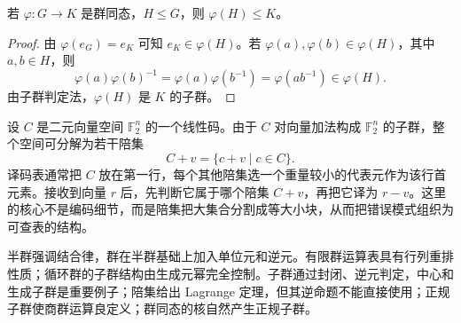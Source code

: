 \begin{theorem}[同态像保持子群]\label{homomorphic-image-subgroup}
  若 $\varphi:G\to K$ 是群同态，$H\le G$，则 $\varphi(H)\le K$。
\end{theorem}

\begin{proof}
  由 $\varphi(e_G)=e_K$ 可知 $e_K\in\varphi(H)$。若
  $\varphi(a),\varphi(b)\in\varphi(H)$，其中 $a,b\in H$，则
  \[
  \varphi(a)\varphi(b)^{-1}=\varphi(a)\varphi(b^{-1})
  =\varphi(ab^{-1})\in\varphi(H).
  \]
  由子群判定法，$\varphi(H)$ 是 $K$ 的子群。
\end{proof}

\begin{example}[title={应用阅读：线性码的陪集译码思想}]\label{slepian-reading}
  设 $C$ 是二元向量空间 $\mathbb F_2^n$ 的一个线性码。由于 $C$ 对向量加法构成 $\mathbb F_2^n$ 的子群，整个空间可分解为若干陪集
  \[
  C+v=\{c+v\mid c\in C\}.
  \]
  译码表通常把 $C$ 放在第一行，每个其他陪集选一个重量较小的代表元作为该行首元素。接收到向量 $r$ 后，先判断它属于哪个陪集 $C+v$，再把它译为 $r-v$。这里的核心不是编码细节，而是陪集把大集合分割成等大小块，从而把错误模式组织为可查表的结构。
\end{example}

\begin{summary}[本节提要]
  半群强调结合律，群在半群基础上加入单位元和逆元。有限群运算表具有行列重排性质；循环群的子群结构由生成元幂完全控制。子群通过封闭、逆元判定，中心和生成子群是重要例子；陪集给出 Lagrange 定理，但其逆命题不能直接使用；正规子群使商群运算良定义；群同态的核自然产生正规子群。
\end{summary}
